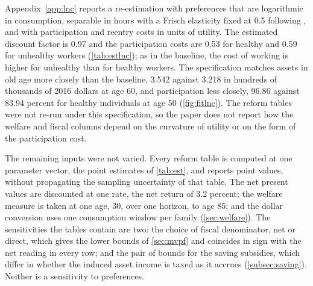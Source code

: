 Appendix~\ref{app:lnc} reports a re-estimation with preferences that are logarithmic in consumption, separable in hours with a Frisch elasticity fixed at 0.5 following \citet{chetty2012bounds}, and with participation and reentry costs in units of utility. %
The estimated discount factor is 0.97 and the participation costs are 0.53 for healthy and 0.59 for unhealthy workers (\autoref{tab:estlnc}); as in the baseline, the cost of working is higher for unhealthy than for healthy workers. %
The specification matches assets in old age more closely than the baseline, 3.542 against 3.218 in hundreds of thousands of 2016 dollars at age 60, and participation less closely, 96.86 against 83.94 percent for healthy individuals at age 50 (\autoref{fig:fitlnc}). %
The reform tables were not re-run under this specification, so the paper does not report how the welfare and fiscal columns depend on the curvature of utility or on the form of the participation cost.

The remaining inputs were not varied. Every reform table is computed at one parameter vector, the point estimates of \autoref{tab:est}, and reports point values, without propagating the sampling uncertainty of that table. The net present values are discounted at one rate, the net return of 3.2 percent; the welfare measure is taken at one age, 30, over one horizon, to age 85; and the dollar conversion uses one consumption window per family (\autoref{sec:welfare}). %
The sensitivities the tables contain are two: the choice of fiscal denominator, net or direct, which gives the lower bounds of \autoref{sec:mvpf} and coincides in sign with the net reading in every row; and the pair of bounds for the saving subsidies, which differ in whether the induced asset income is taxed as it accrues (\autoref{subsec:saving}). Neither is a sensitivity to preferences.
